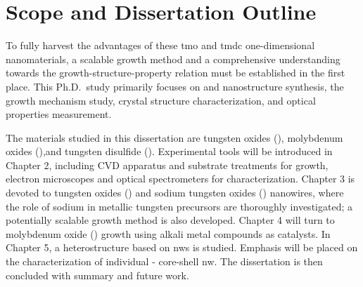 \section{Scope and Dissertation Outline}
To fully harvest the advantages of these \gls{tmo} and \gls{tmdc} one-dimensional nanomaterials, a scalable growth method and a comprehensive understanding towards the growth-structure-property relation must be established in the first place. This Ph.D.\ study primarily focuses on  and  nanostructure synthesis, the growth mechanism study, crystal structure characterization, and optical properties measurement.

The materials studied in this dissertation are tungsten oxides (), molybdenum oxides (),and tungsten disulfide (). Experimental tools will be introduced in Chapter 2, including CVD apparatus and substrate treatments for growth, electron microscopes and optical spectrometers for characterization. Chapter 3 is devoted to tungsten oxides () and sodium tungsten oxides () nanowires, where the role of sodium in metallic tungsten precursors are thoroughly investigated; a potentially scalable growth method is also developed. Chapter 4 will turn to molybdenum oxide () growth using alkali metal compounds as catalysts. In Chapter 5, a heterostructure based on  \glspl{nw} is studied. Emphasis will be placed on the characterization of individual - core-shell \gls{nw}. The dissertation is then concluded with summary and future work. 
